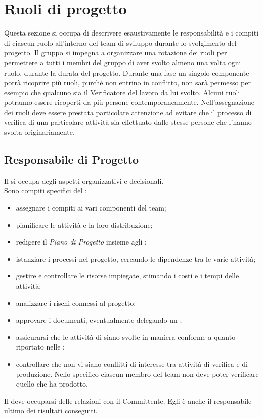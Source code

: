 \section{Ruoli di progetto}

Questa sezione si occupa di descrivere esaustivamente le responsabilità e i compiti di ciascun ruolo all'interno del team di sviluppo durante lo svolgimento del progetto.
Il gruppo \GroupName si impegna a organizzare una rotazione dei ruoli per permettere a tutti i membri del gruppo di aver svolto almeno una volta ogni ruolo, durante la durata del progetto. Durante una fase un singolo componente potrà ricoprire più ruoli, purché non entrino in conﬂitto, non sarà permesso per esempio che qualcuno sia il Veriﬁcatore del lavoro da lui svolto. Alcuni ruoli potranno essere ricoperti da più persone contemporaneamente.
Nell'assegnazione dei ruoli deve essere prestata particolare attenzione ad evitare che il processo di verifica di una particolare attività sia effettuato dalle stesse persone che l'hanno svolta originariamente.


\subsection{Responsabile di Progetto} \label{sec:responsabile}
Il \Responsabile{} si occupa degli aspetti organizzativi e decisionali.\\
Sono compiti specifici del \Responsabile:
\begin{itemize}
	\item assegnare i compiti ai vari componenti del team;
	\item pianificare le attività e la loro distribuzione;
	\item redigere il \textit{Piano di Progetto} insieme agli \Amministratori;
	\item istanziare i processi nel progetto, cercando le dipendenze tra le varie attività;
	\item gestire e controllare le risorse impiegate, stimando i costi e i tempi delle attività;
	\item analizzare i rischi connessi al progetto;
	\item approvare i documenti, eventualmente delegando un \Verificatore;
	\item assicurarsi che le attività di \VV{} siano svolte in maniera conforme a quanto riportato nelle \NormeDiProgetto;
	\item controllare che non vi siano conflitti di interesse tra attività di verifica e di produzione. Nello specifico ciascun membro del team non deve poter verificare quello che ha prodotto.
\end{itemize}
Il \Responsabile{} deve occuparsi delle relazioni con il Committente.
Egli è anche il responsabile ultimo dei risultati conseguiti.


